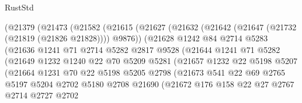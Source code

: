\begin{lexlean}{RustStd}
\begin{coremodule}
{\begin{coremodule}
{{{{{{{{{{{{{{{{{{{{{{{{{{{{{{{{{{{{{{{                  (@21379
                    (@21473
                      (@21582
                        (@21615
                          (@21627
                            (@21632 (@21642 (@21647 (@21732 (@21819 (@21826 @21828)))) @9876))
                            (@21628
                              @1242
                              @84
                              @2714
                              @5283
                              (@21636
                                @1241
                                @71
                                @2714
                                @5282
                                @2817
                                @9528
                                (@21644
                                  @1241
                                  @71
                                  @5282
                                  (@21649
                                    @1232
                                    @1240
                                    @22
                                    @70
                                    @5209
                                    @5281
                                    (@21657
                                      @1232
                                      @22
                                      @5198
                                      @5207
                                      (@21664
                                        @1231
                                        @70
                                        @22
                                        @5198
                                        @5205
                                        @2798
                                        (@21673
                                          @541
                                          @22
                                          @69
                                          @2765
                                          @5197
                                          @5204
                                          @2702
                                          @5180
                                          @2708
                                          @21690
                                          (@21672
                                            @176
                                            @158
                                            @22
                                            @27
                                            @2767
                                            @2714
                                            @2727
                                            @2702
}}}}}}}}}}}}}}}}}}}}}}}}}}}}}}}}}}}}}}}
\end{coremodule}}
\end{coremodule}
\end{lexlean}
